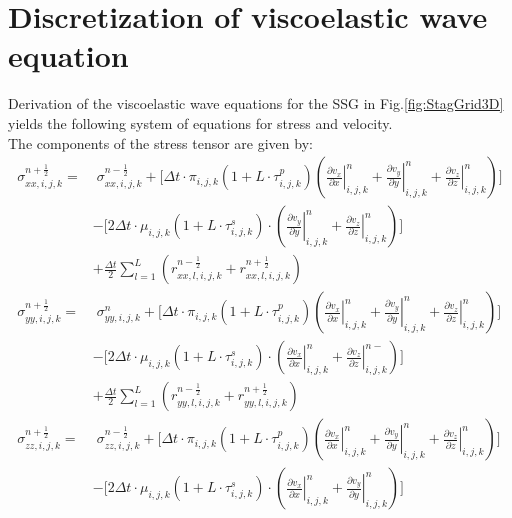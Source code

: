 \documentclass[pdftex,a4paper,parskip,listof=totoc,bibliography=totoc,onehalfspacing,12pt]{scrreprt}
\begin{document}
\section{Discretization of viscoelastic wave equation}
Derivation of the viscoelastic wave equations for the SSG in Fig.\ref{fig:StagGrid3D} yields the following system of equations for stress and velocity. \\
The components of the stress tensor are given by:
\begin{align*}
	\sigma_{xx,i,j,k}^{n+\frac{1}{2}} =& \;\sigma_{xx,i,j,k}^{n-\frac{1}{2}}+ \Bigg[ \Delta t \cdot \pi_{i,j,k} \left(1+L\cdot \tau^p_{i,j,k}\right)\left( \left.\frac{\partial v_x}{\partial x}\right\rvert_{i,j,k}^{n} + \left.\frac{\partial v_y}{\partial y}\right\rvert_{i,j,k}^{n} + \left.\frac{\partial v_z}{\partial z}\right\rvert_{i,j,k}^{n} \right)\Bigg]  \\
	&- \Bigg[ 2 \Delta t \cdot \mu_{i,j,k} \left(1+L\cdot \tau^s_{i,j,k}\right)\cdot \left( \left.\frac{\partial v_y}{\partial y}\right\rvert_{i,j,k}^{n} + \left.\frac{\partial v_z}{\partial z}\right\rvert_{i,j,k}^{n} \right)\Bigg] \\
	&+ \frac{\Delta t}{2} \sum _{l=1}^{L} \left( r_{xx,l,i,j,k}^{n-\frac{1}{2}}+ r_{xx,l,i,j,k}^{n+\frac{1}{2}}\right) \\
	\sigma_{yy,i,j,k}^{n+\frac{1}{2}} =&\;\sigma_{yy,i,j,k}^{n}+ \Bigg[ \Delta t \cdot \pi_{i,j,k} \left(1+L\cdot \tau^p_{i,j,k}\right)\left( \left.\frac{\partial v_x}{\partial x}\right\rvert_{i,j,k}^{n} + \left.\frac{\partial v_y}{\partial y}\right\rvert_{i,j,k}^{n} + \left.\frac{\partial v_z}{\partial z}\right\rvert_{i,j,k}^{n} \right)\Bigg]  \\
	&- \Bigg[ 2 \Delta t \cdot \mu_{i,j,k} \left(1+L\cdot \tau^s_{i,j,k}\right)\cdot \left( \left.\frac{\partial v_x}{\partial x}\right\rvert_{i,j,k}^{n} + \left.\frac{\partial v_z}{\partial z}\right\rvert_{i,j,k}^{n-} \right)\Bigg] \\
	&+ \frac{\Delta t}{2} \sum _{l=1}^{L} \left( r_{yy,l,i,j,k}^{n-\frac{1}{2}}+ r_{yy,l,i,j,k}^{n+\frac{1}{2}}\right)\\ 
	\sigma_{zz,i,j,k}^{n+\frac{1}{2}} =&\;\sigma_{zz,i,j,k}^{n-\frac{1}{2}}+ \Bigg[ \Delta t \cdot \pi_{i,j,k} \left(1+L\cdot \tau^p_{i,j,k}\right)\left( \left.\frac{\partial v_x}{\partial x}\right\rvert_{i,j,k}^{n}+ \left.\frac{\partial v_y}{\partial y}\right\rvert_{i,j,k}^{n} + \left.\frac{\partial v_z}{\partial z}\right\rvert_{i,j,k}^{n} \right)\Bigg]  \\
	&- \Bigg[ 2 \Delta t \cdot \mu_{i,j,k} \left(1+L\cdot \tau^s_{i,j,k}\right)\cdot \left( \left.\frac{\partial v_x}{\partial x}\right\rvert_{i,j,k}^{n} + \left.\frac{\partial v_y}{\partial y}\right\rvert_{i,j,k}^{n} \right)\Bigg] \\

\end{align*}
\end{document}
